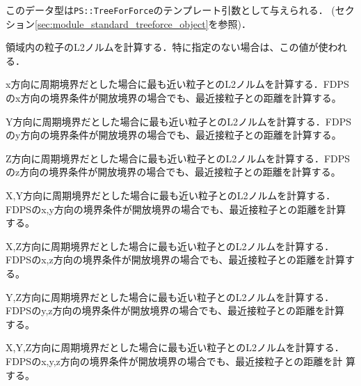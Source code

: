 このデータ型は{\tt PS::TreeForForce}のテンプレート引数として与えられる．
(セクション\ref{sec:module_standard_treeforce_object}を参照)．


領域内の粒子のL2ノルムを計算する．特に指定のない場合は、この値が使われる．


x方向に周期境界だとした場合に最も近い粒子とのL2ノルムを計算する．FDPS
のx方向の境界条件が開放境界の場合でも、最近接粒子との距離を計算する。


Y方向に周期境界だとした場合に最も近い粒子とのL2ノルムを計算する．FDPS
のy方向の境界条件が開放境界の場合でも、最近接粒子との距離を計算する。


Z方向に周期境界だとした場合に最も近い粒子とのL2ノルムを計算する．FDPS
のz方向の境界条件が開放境界の場合でも、最近接粒子との距離を計算する。


X,Y方向に周期境界だとした場合に最も近い粒子とのL2ノルムを計算する．
FDPSのx,y方向の境界条件が開放境界の場合でも、最近接粒子との距離を計算
する。


X,Z方向に周期境界だとした場合に最も近い粒子とのL2ノルムを計算する．
FDPSのx,z方向の境界条件が開放境界の場合でも、最近接粒子との距離を計算す
る。


Y,Z方向に周期境界だとした場合に最も近い粒子とのL2ノルムを計算する．
FDPSのy,z方向の境界条件が開放境界の場合でも、最近接粒子との距離を計算
する。


X,Y,Z方向に周期境界だとした場合に最も近い粒子とのL2ノルムを計算する．
FDPSのx,y,z方向の境界条件が開放境界の場合でも、最近接粒子との距離を計
算する。
